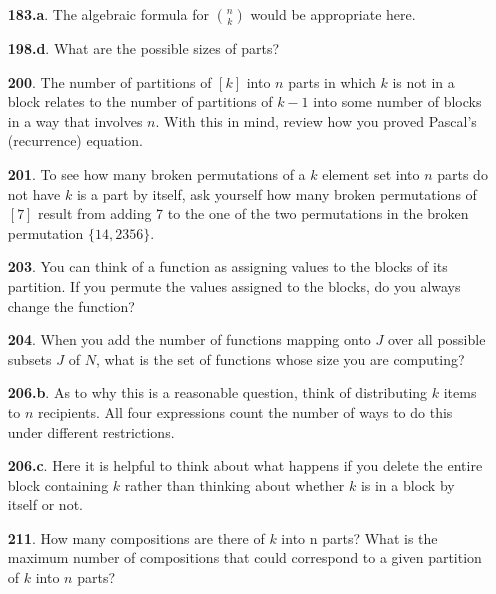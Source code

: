 \documentclass[10pt,]{book}
\theoremstyle{plain}
\theoremstyle{definition}
\theoremstyle{definition}
\theoremstyle{definition}
\numberwithin{equation}{chapter}
\begin{document}
\begin{itemize}[itemsep=1em]
\item[\textbf{183.a}.]\hypertarget{p-1037}{}%
The algebraic formula for \(\binom{n}{k}\) would be appropriate here.%

\item[\textbf{198.d}.]\hypertarget{p-1082}{}%
What are the possible sizes of parts?%

\item[\textbf{200}.]\hypertarget{p-1089}{}%
The number of partitions of \([k]\) into \(n\) parts in which \(k\) is not in a block relates to the number of partitions of \(k-1\) into some number of blocks in a way that involves \(n\). With this in mind, review how you proved Pascal's (recurrence) equation.%

\item[\textbf{201}.]\hypertarget{p-1092}{}%
To see how many broken permutations of a \(k\) element set into \(n\) parts do not have \(k\) is a part by itself, ask yourself how many broken permutations of \([7]\) result from adding 7 to the one of the two permutations in the broken permutation \(\{14, 2356\}\).%

\item[\textbf{203}.]\hypertarget{p-1098}{}%
You can think of a function as assigning values to the blocks of its partition. If you permute the values assigned to the blocks, do you always change the function?%

\item[\textbf{204}.]\hypertarget{p-1102}{}%
When you add the number of functions mapping onto \(J\) over all possible subsets \(J\) of \(N\), what is the set of functions whose size you are computing?%

\item[\textbf{206.b}.]\hypertarget{p-1111}{}%
As to why this is a reasonable question, think of distributing \(k\) items to \(n\) recipients.  All four expressions count the number of ways to do this under different restrictions.%

\item[\textbf{206.c}.]\hypertarget{p-1113}{}%
Here it is helpful to think about what happens if you delete the entire block containing \(k\) rather than thinking about whether \(k\) is in a block by itself or not.%

\item[\textbf{211}.]\hypertarget{p-1131}{}%
How many compositions are there of \(k\) into n parts? What is the maximum number of compositions that could correspond to a given partition of \(k\) into \(n\) parts?%


\end{itemize}
\end{document}
